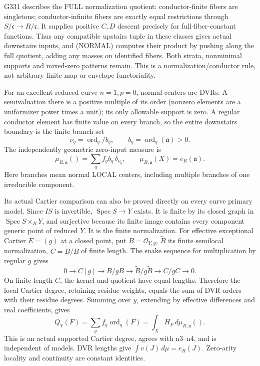 \documentclass[11pt]{article}
\begin{document}
G331 describes the FULL normalization quotient: conductor-finite fibers are singletons; conductor-infinite fibers are exactly equal restrictions through \(S/\mathfrak c\to R/\mathfrak c\). It supplies positive \(C,D\) descent precisely for full-fiber-constant functions. Thus any compatible upstairs tuple in these classes gives actual downstairs inputs, and (NORMAL) computes their product by pushing along the full quotient, adding any masses on identified fibers. Both strata, nonminimal supports and mixed-zero patterns remain. This is a normalization/conductor rule, not arbitrary finite-map or envelope functoriality.

For an excellent reduced curve \(n=1,p=0\), normal centers are DVRs. A semivaluation there is a positive multiple of its order (nonzero elements are a uniformizer power times a unit); its only allowable support is zero. A regular conductor element has finite value on every branch, so the entire downstairs boundary is the finite branch set
\[
\nu_q=\operatorname{ord}_q/b_q,\qquad b_q=\operatorname{ord}_q(\mathfrak a)>0.
\]
The independently geometric zero-input measure is
\[
\mu_{R,\mathfrak a}()=\sum_q f_qb_q\,\delta_{\nu_q},\qquad
\mu_{R,\mathfrak a}(X)=e_R(\mathfrak a). \tag{CURVE}
\]
Here branches mean normal LOCAL centers, including multiple branches of one irreducible component.

Its actual Cartier comparison can also be proved directly on every curve primary model. Since \(IS\) is invertible, \(\operatorname{Spec}S\to Y\) exists. It is finite by its closed graph in \(\operatorname{Spec}S\times_RY\), and surjective because its finite image contains every component generic point of reduced \(Y\). It is the finite normalization. For effective exceptional Cartier \(E=(g)\) at a closed point, put \(B=\mathcal O_{Y,y}\), \(\widetilde B\) its finite semilocal normalization, \(C=\widetilde B/B\) of finite length. The snake sequence for multiplication by regular \(g\) gives
\[
0\to C[g]\to B/gB\to\widetilde B/g\widetilde B\to C/gC\to0.
\]
On finite-length \(C\), the kernel and quotient have equal lengths. Therefore the local Cartier degree, retaining residue weights, equals the sum of DVR orders with their residue degrees. Summing over \(y\), extending by effective differences and real coefficients, gives
\[
Q_Y(F)=\sum_q f_q\operatorname{ord}_q(F)
=\int_X H_F\,d\mu_{R,\mathfrak a}().
\]
This is an actual supported Cartier degree, agrees with n3--n4, and is independent of models. DVR lengths give \(\int v(J)\,d\mu=e_R(J)\). Zero-arity locality and continuity are constant identities.
\end{document}
